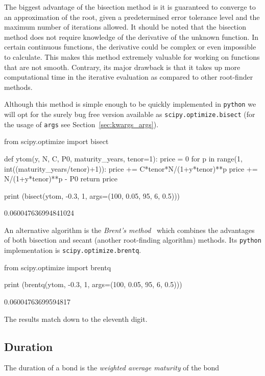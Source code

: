 The biggest advantage of the bisection method is it is guaranteed to converge to an approximation of the root, given a predetermined error tolerance level and the maximum number of iterations allowed. It should be noted that the bisection method does not require knowledge of the derivative of the unknown function. In certain continuous functions, the derivative could be complex or even impossible to calculate. This makes this method extremely valuable for working on functions that are not smooth.
Contrary, its major drawback is that it takes up more computational time in the iterative evaluation as compared to other root-finder methods. 

Although this method is simple enough to be quickly implemented in \texttt{python} we will opt for the surely bug free version available as \texttt{scipy.optimize.bisect} (for the usage of \texttt{args} see Section~\ref{sec:kwargs_args}).

\begin{ipython}
from scipy.optimize import bisect 

def ytom(y, N, C, P0, maturity_years, tenor=1): 
	price = 0
	for p in range(1, int((maturity_years/tenor)+1)):
		price += C*tenor*N/(1+y*tenor)**p
	price += N/(1+y*tenor)**p - P0 
	return price

print (bisect(ytom, -0.3, 1, args=(100, 0.05, 95, 6, 0.5)))
\end{ipython}
\begin{ioutput}
0.060047636994841024
\end{ioutput}

An alternative algorithm is the \emph{Brent's method}~\cite{bib:brent} which combines the advantages of both bisection and secant (another root-finding algorithm) methods. Its \texttt{python} implementation is \texttt{scipy.optimize.brentq}.

\begin{ipython}
from scipy.optimize import brentq
    
print (brentq(ytom, -0.3, 1, args=(100, 0.05, 95, 6, 0.5)))
\end{ipython}
\begin{ioutput}
0.06004763699594817
\end{ioutput}

\noindent
The results match down to the eleventh digit.

\subsection{Duration}
The duration of a bond is the \emph{weighted average maturity} of the bond

